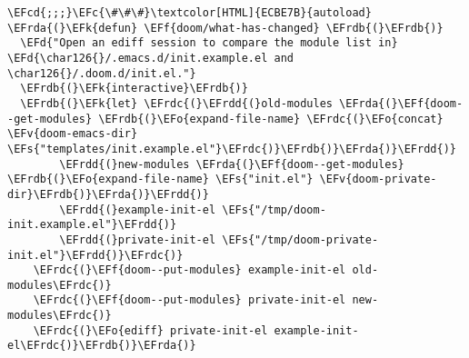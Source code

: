 \documentclass[a4wide,10pt]{article}
\newcommand{\EFc}[1]{\textcolor{EFc}{#1}} %
\newcommand{\EFcd}[1]{\textcolor{EFcd}{#1}} %
\newcommand{\EFs}[1]{\textcolor{EFs}{#1}} %
\newcommand{\EFd}[1]{\textcolor{EFd}{#1}} %
\newcommand{\EFk}[1]{\textcolor{EFk}{#1}} %
\newcommand{\EFf}[1]{\textcolor{EFf}{#1}} %
\newcommand{\EFv}[1]{\textcolor{EFv}{#1}} %
\newcommand{\EFo}[1]{\textcolor{EFo}{#1}} %
\newcommand{\EFrda}[1]{\textcolor{EFrda}{#1}} %
\newcommand{\EFrdb}[1]{\textcolor{EFrdb}{#1}} %
\newcommand{\EFrdc}[1]{\textcolor{EFrdc}{#1}} %
\newcommand{\EFrdd}[1]{\textcolor{EFrdd}{#1}} %
\begin{document}
\begin{Code}
\begin{Verbatim}
\EFcd{;;;}\EFc{\#\#\#}\textcolor[HTML]{ECBE7B}{autoload}
\EFrda{(}\EFk{defun} \EFf{doom/what-has-changed} \EFrdb{(}\EFrdb{)}
  \EFd{"Open an ediff session to compare the module list in}
\EFd{\char126{}/.emacs.d/init.example.el and \char126{}/.doom.d/init.el."}
  \EFrdb{(}\EFk{interactive}\EFrdb{)}
  \EFrdb{(}\EFk{let} \EFrdc{(}\EFrdd{(}old-modules \EFrda{(}\EFf{doom--get-modules} \EFrdb{(}\EFo{expand-file-name} \EFrdc{(}\EFo{concat} \EFv{doom-emacs-dir} \EFs{"templates/init.example.el"}\EFrdc{)}\EFrdb{)}\EFrda{)}\EFrdd{)}
        \EFrdd{(}new-modules \EFrda{(}\EFf{doom--get-modules} \EFrdb{(}\EFo{expand-file-name} \EFs{"init.el"} \EFv{doom-private-dir}\EFrdb{)}\EFrda{)}\EFrdd{)}
        \EFrdd{(}example-init-el \EFs{"/tmp/doom-init.example.el"}\EFrdd{)}
        \EFrdd{(}private-init-el \EFs{"/tmp/doom-private-init.el"}\EFrdd{)}\EFrdc{)}
    \EFrdc{(}\EFf{doom--put-modules} example-init-el old-modules\EFrdc{)}
    \EFrdc{(}\EFf{doom--put-modules} private-init-el new-modules\EFrdc{)}
    \EFrdc{(}\EFo{ediff} private-init-el example-init-el\EFrdc{)}\EFrdb{)}\EFrda{)}

\end{Verbatim}
\end{Code}
\end{document}
